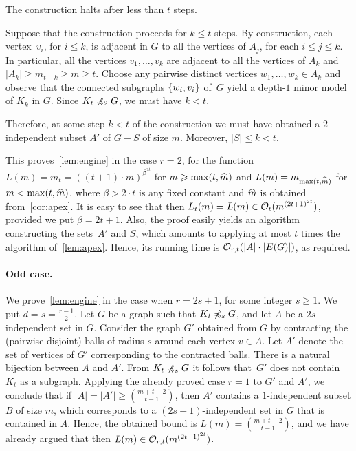 \begin{claim}\label{claim:at-most-t}
	The construction halts after less than $t$ steps.
\end{claim}
\begin{clproof}
Suppose that the construction proceeds for $k\le t$ steps.
By construction, each vertex~$v_i$, for $i\le k$, is adjacent in $G$
 to all the vertices of $A_{j}$, for each $i\le j\le k$. In particular, all the vertices $v_1,\ldots,v_k$ are adjacent to all the vertices of $A_{k}$
 and $|A_k|\ge m_{t-k}\ge m\ge t$.
Choose any pairwise distinct vertices $w_1,\ldots,w_k\in A_k$ and observe that the connected subgraphs $\{w_i,v_i\}$ of~$G$ yield a depth-$1$ minor model of $K_k$ in $G$.
 Since $K_t\not\preccurlyeq_2 G$, we must have $k<t$.
 \end{clproof}
 
 Therefore, at some step $k<t$ of the construction we must have obtained a $2$-independent subset $A'$ of $G-S$ of size $m$. Moreover, $|S|\le k<t$.
 
 
 
 This proves~\cref{lem:engine} in the case $r=2$, for the function $L(m)=m_t=((t+1)\cdot m)^{\beta^{2t}}$
 for $m\geqslant \max(t,\widehat{m})$ and $L(m)=m_{\max(t,\widehat{m})}$ for $m<\max(t,\widehat{m})$, where $\beta>2\cdot t$ is any fixed constant and $\widehat{m}$ is obtained from~\cref{cor:apex}.
 It is easy to see that then $L_t(m)=L(m)\in \mathcal{O}_{t}{(m^{{(2t+1)}^{2t}})}$, provided we put $\beta=2t+1$.
 Also, the proof easily yields an algorithm constructing the sets~$A'$ and $S$,
 which amounts to applying at most $t$ times the algorithm of~\cref{lem:apex}.
 Hence, its running time  is $\mathcal{O}_{r,t}(|A|\cdot |E(G)|)$, as required.


\paragraph{Odd case.}
We prove~\cref{lem:engine} in the case when $r=2s+1$, for some integer $s\geq 1$. We put $d=s=\frac{r-1}{2}$.
Let $G$ be a graph such that $K_t\not\preccurlyeq_s G$, and 
 let $A$ be a $2s$-independent set in $G$. Consider the graph $G'$ obtained from $G$
by contracting the (pairwise disjoint) balls of radius $s$ around each vertex $v\in A$.
 Let $A'$ denote the set of vertices of $G'$ corresponding to the contracted balls. There is a natural bijection between $A$ and $A'$.
From $K_t\not\preccurlyeq_s G$ it follows that~$G'$ does not contain $K_t$ as a subgraph. Applying the already proved case $r=1$ to $G'$ and $A'$, we conclude that 
if $|A|=|A'|\ge {m+t-2\choose t-1}$, then
 $A'$ contains a $1$-independent subset $B$ of size $m$,
 which corresponds to a $(2s+1)$-independent set in $G$ that is contained in $A$.
 Hence, the obtained bound is $L(m)={m+t-2\choose t-1}$, and we have already argued that then $L(m)\in \mathcal{O}_{r,t}{(m^{{(2t+1)}^{2t}})}$.
 
